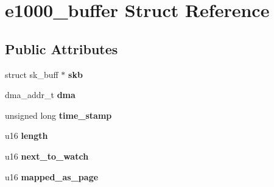 \hypertarget{structe1000__buffer}{
\section{e1000\_\-buffer Struct Reference}
\label{structe1000__buffer}
}
\subsection*{Public Attributes}
\begin{DoxyCompactItemize}
\item 
\hypertarget{structe1000__buffer_ac5cbef5146c263af46ff735c237cd0f2}{
struct sk\_\-buff $\ast$ {\bfseries skb}}
\label{structe1000__buffer_ac5cbef5146c263af46ff735c237cd0f2}

\item 
\hypertarget{structe1000__buffer_a0a0927d3015b37b8338421df47afd9cf}{
dma\_\-addr\_\-t {\bfseries dma}}
\label{structe1000__buffer_a0a0927d3015b37b8338421df47afd9cf}

\item 
\hypertarget{structe1000__buffer_abc55d24f31f25b71a1f7aea59a91d7af}{
unsigned long {\bfseries time\_\-stamp}}
\label{structe1000__buffer_abc55d24f31f25b71a1f7aea59a91d7af}

\item 
\hypertarget{structe1000__buffer_a9f23fe1e3d1fb18b75ea0b339056c547}{
u16 {\bfseries length}}
\label{structe1000__buffer_a9f23fe1e3d1fb18b75ea0b339056c547}

\item 
\hypertarget{structe1000__buffer_a1f4c203183365f4a6b84f5f46e608764}{
u16 {\bfseries next\_\-to\_\-watch}}
\label{structe1000__buffer_a1f4c203183365f4a6b84f5f46e608764}

\item 
\hypertarget{structe1000__buffer_a29c8eba22eb7df077e9284e19b8996c4}{
u16 {\bfseries mapped\_\-as\_\-page}}
\label{structe1000__buffer_a29c8eba22eb7df077e9284e19b8996c4}


\end{DoxyCompactItemize}
